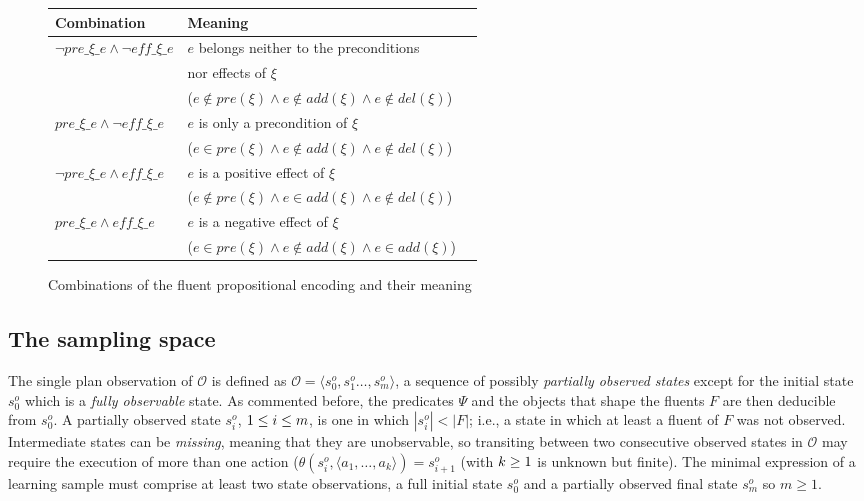 \documentclass[runningheads]{llncs}
\newcommand{\tup}[1]{{\langle #1 \rangle}}
\begin{document}
\begin{figure}
	\begin{footnotesize}
		\begin{tabular}{lll}
			{\bf Combination} & {\bf Meaning}\\\hline
			$\neg pre\_\xi\_e \wedge \neg eff\_\xi\_e $& $e$ belongs neither to the preconditions \\
             & nor effects of $\xi$ \\
             & ($e \notin pre(\xi) \wedge e \notin add(\xi) \wedge e \notin del(\xi)$)\\
			$pre\_\xi\_e \wedge \neg eff\_\xi\_e $& $e$ is only a precondition of $\xi$\\
               &  ($e \in pre(\xi) \wedge e \notin add(\xi) \wedge e \notin del(\xi)$) \\
			$\neg pre\_\xi\_e \wedge eff\_\xi\_e $& $e$ is a positive effect of $\xi$ \\
               &  ($e \notin pre(\xi) \wedge e \in add(\xi) \wedge e \notin del(\xi)$) \\
			$pre\_\xi\_e \wedge eff\_\xi\_e  $& $e$ is a negative effect of $\xi$ \\
               &  ($e \in pre(\xi) \wedge e \notin add(\xi) \wedge e \in add(\xi)$) \\
		\end{tabular}
	\end{footnotesize}
	\caption{\small Combinations of the fluent propositional encoding and their meaning}
	\label{fig:combinations}
\end{figure}


\subsection{The sampling space}

The single plan observation of $\mathcal{O}$ is defined as $\mathcal{O}=\tup{s_0^o,s_1^o \ldots, s_m^o}$, a sequence of possibly {\em partially observed states} except for the initial state $s_0^o$ which is a {\em fully observable} state. As commented before, the predicates $\Psi$ and the objects that shape the fluents $F$ are then deducible from $s_0^o$. A partially observed state $s_i^o$, ${\small 1\leq i\leq m}$, is one in which $|s_i^o| < |F|$; i.e., a state in which at least a fluent of $F$ was not observed. Intermediate states can be {\em missing}, meaning that they are unobservable, so transiting between two consecutive observed states in $\mathcal{O}$ may require the execution of more than one action ($\theta(s_i^o,\tup{a_1,\ldots,a_k})=s_{i+1}^o$ (with ${\small k\geq 1}$ is unknown but finite). The minimal expression of a learning sample must comprise at least two state observations, a full initial state $s_0^o$ and a partially observed final state $s_m^o$ so $m \geq 1$.
\end{document}
